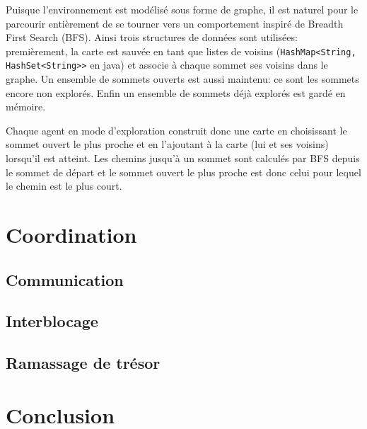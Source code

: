\documentclass[11pt]{article}
\begin{document}
Puisque l'environnement est modélisé sous forme de graphe, il est naturel pour le parcourir entièrement de se tourner vers un comportement inspiré de Breadth First Search (BFS). Ainsi trois structures de données sont utilisées: premièrement, la carte est sauvée en tant que listes de voisins (\texttt{HashMap<String, HashSet<String>{}>} en java) et associe à chaque sommet ses voisins dans le graphe. Un ensemble de sommets ouverts est aussi maintenu: ce sont les sommets encore non explorés. Enfin un ensemble de sommets déjà explorés est gardé en mémoire.

Chaque agent en mode d'exploration construit donc une carte en choisissant le sommet ouvert le plus proche et en l'ajoutant à la carte (lui et ses voisins)  lorsqu'il est atteint. Les chemins jusqu'à un sommet sont calculés par BFS depuis le sommet de départ et le sommet ouvert le plus proche est donc celui pour lequel le chemin est le plus court.
\section{Coordination}
\subsection{Communication}
\subsection{Interblocage}
\subsection{Ramassage de trésor}
\section{Conclusion}
\end{document}
